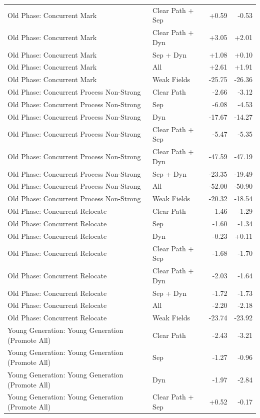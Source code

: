 \begin{table}[t]
\begin{tabular}{llrr}
Old Phase: Concurrent Mark & Clear Path + Sep & +0.59 & -0.53 \\
Old Phase: Concurrent Mark & Clear Path + Dyn & +3.05 & +2.01 \\
Old Phase: Concurrent Mark & Sep + Dyn & +1.08 & +0.10 \\
Old Phase: Concurrent Mark & All & +2.61 & +1.91 \\
Old Phase: Concurrent Mark & Weak Fields & -25.75 & -26.36 \\
Old Phase: Concurrent Process Non-Strong & Clear Path & -2.66 & -3.12 \\
Old Phase: Concurrent Process Non-Strong & Sep & -6.08 & -4.53 \\
Old Phase: Concurrent Process Non-Strong & Dyn & -17.67 & -14.27 \\
Old Phase: Concurrent Process Non-Strong & Clear Path + Sep & -5.47 & -5.35 \\
Old Phase: Concurrent Process Non-Strong & Clear Path + Dyn & -47.59 & -47.19 \\
Old Phase: Concurrent Process Non-Strong & Sep + Dyn & -23.35 & -19.49 \\
Old Phase: Concurrent Process Non-Strong & All & -52.00 & -50.90 \\
Old Phase: Concurrent Process Non-Strong & Weak Fields & -20.32 & -18.54 \\
Old Phase: Concurrent Relocate & Clear Path & -1.46 & -1.29 \\
Old Phase: Concurrent Relocate & Sep & -1.60 & -1.34 \\
Old Phase: Concurrent Relocate & Dyn & -0.23 & +0.11 \\
Old Phase: Concurrent Relocate & Clear Path + Sep & -1.68 & -1.70 \\
Old Phase: Concurrent Relocate & Clear Path + Dyn & -2.03 & -1.64 \\
Old Phase: Concurrent Relocate & Sep + Dyn & -1.72 & -1.73 \\
Old Phase: Concurrent Relocate & All & -2.20 & -2.18 \\
Old Phase: Concurrent Relocate & Weak Fields & -23.74 & -23.92 \\
Young Generation: Young Generation (Promote All) & Clear Path & -2.43 & -3.21 \\
Young Generation: Young Generation (Promote All) & Sep & -1.27 & -0.96 \\
Young Generation: Young Generation (Promote All) & Dyn & -1.97 & -2.84 \\
Young Generation: Young Generation (Promote All) & Clear Path + Sep & +0.52 & -0.17 \\

\end{tabular}
\end{table}
